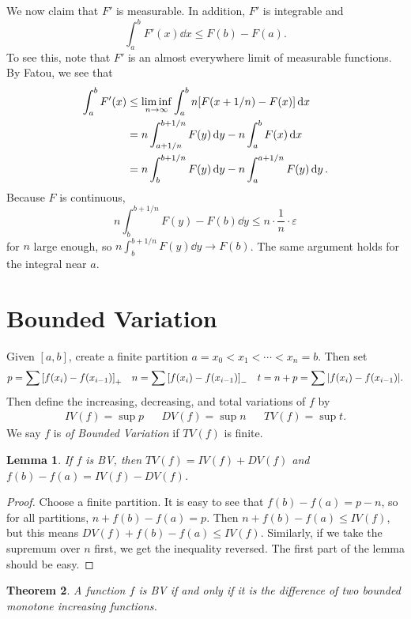 \documentclass[leqno, openany]{memoir}
\newtheorem{thm}{Theorem}[chapter]
\newtheorem{lem}[thm]{Lemma}
\theoremstyle{definition}
\theoremstyle{remark}
\theoremstyle{plain}
\theoremstyle{definition}
\theoremstyle{remark}
\newcommand{\ep}{\varepsilon}
\begin{document}
We now claim that $F'$ is measurable. In addition, $F'$ is integrable and
\[ \int_a^b F'(x) \dd{x} \leq F(b) - F(a). \]
To see this, note that $F'$ is an almost everywhere limit of measurable functions. By Fatou, we see that 
\begin{align*}
    \int_a^b F'(x) &\leq \liminf_{n \to \infty} \int_a^b n \qty[F(x+1/n) - F(x)] \dd{x} \\ 
                   &= n \int_{a+1/n}^{b+1/n} F(y) \dd{y} - n \int_a^b F(x) \dd{x} \\
                   &= n \int_b^{b+1/n} F(y) \dd{y} - n \int_a^{a+1/n} F(y) \dd{y}.
\end{align*}
Because $F$ is continuous, 
\[ n \int_b^{b+1/n} F(y) - F(b) \dd{y} \leq n \cdot \frac{1}{n} \cdot \ep\]
for $n$ large enough, so $n \int_b^{b+1/n} F(y) \dd{y} \to F(b)$. The same argument holds for the integral near $a$.

\section{Bounded Variation}%
\label{sec:bounded_variation}

Given $[a,b]$, create a finite partition $a = x_0 < x_1 < \cdots < x_n = b$. Then set
\begin{align*}
    p = \sum \qty[f(x_i) - f(x_{i-1})]_+ & & n = \sum \qty[f(x_i) - f(x_{i-1})]_- && t = n+p = \sum \abs{f(x_i) - f(x_{i-1})}. 
\end{align*}
Then define the increasing, decreasing, and total variations of $f$ by
\begin{align*}
    IV(f) = \sup p & & DV(f) = \sup n & & TV(f) = \sup t.
\end{align*}
We say $f$ is \textit{of Bounded Variation} if $TV(f)$ is finite.

\begin{lem}
    If $f$ is BV, then $TV(f) = IV(f) + DV(f)$ and $f(b) - f(a) = IV(f) - DV(f)$.
\end{lem}

\begin{proof}
    Choose a finite partition. It is easy to see that $f(b) - f(a) = p - n$, so for all partitions, $n + f(b) - f(a) = p$. Then $n + f(b) - f(a) \leq IV(f)$, but this means $DV(f) + f(b) - f(a) \leq IV(f)$. Similarly, if we take the supremum over $n$ first, we get the inequality reversed. The first part of the lemma should be easy.
\end{proof}

\begin{thm}
    A function $f$ is BV if and only if it is the difference of two bounded monotone increasing functions.
\end{thm}
\end{document}
